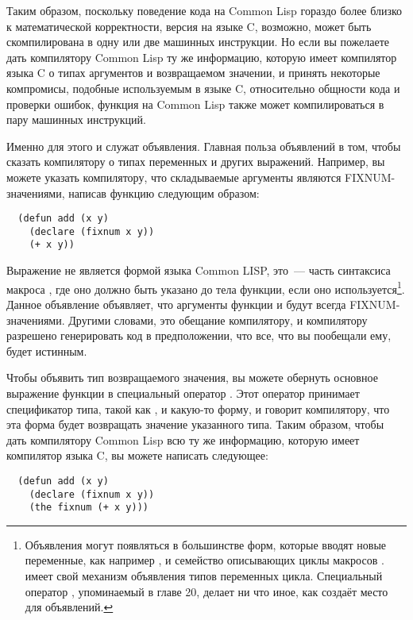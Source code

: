 Таким образом, поскольку поведение кода на Common Lisp гораздо более близко к
математической корректности, версия на языке C, возможно, может быть скомпилирована в одну
или две машинных инструкции. Но если вы пожелаете дать компилятору Common Lisp ту же
информацию, которую имеет компилятор языка C о типах аргументов и возвращаемом значении, и
принять некоторые компромисы, подобные используемым в языке C, относительно общности кода
и проверки ошибок, функция на Common Lisp также может компилироваться в пару машинных
инструкций.

Именно для этого и служат объявления. Главная польза объявлений в том, чтобы сказать компилятору о типах переменных и других выражений. Например, вы можете указать компилятору, что складываемые аргументы являются FIXNUM-значениями, написав функцию следующим образом:

\begin{lstlisting}
  (defun add (x y)
    (declare (fixnum x y))
    (+ x y))
\end{lstlisting}

Выражение  не является формой языка Common LISP, это~--- часть синтаксиса
макроса , где оно должно быть указано до тела функции, если оно
используется\footnote{Объявления могут появляться в большинстве форм, которые вводят новые
  переменные, как например ,  и семейство описывающих циклы макросов
  .  имеет свой механизм объявления типов переменных
  цикла. Специальный оператор , упоминаемый в главе 20, делает ни что иное,
  как создаёт место для объявлений.}. Данное объявление объявляет, что аргументы функции
 и  будут всегда FIXNUM-значениями. Другими словами, это обещание
компилятору, и компилятору разрешено генерировать код в предположении, что все, что вы
пообещали ему, будет истинным.

Чтобы объявить тип возвращаемого значения, вы можете обернуть основное выражение функции
 в специальный оператор . Этот оператор принимает спецификатор
типа, такой как , и какую-то форму, и говорит компилятору, что эта форма
будет возвращать значение указанного типа. Таким образом, чтобы дать компилятору Common
Lisp всю ту же информацию, которую имеет компилятор языка C, вы можете написать следующее:

\begin{lstlisting}
  (defun add (x y)
    (declare (fixnum x y))
    (the fixnum (+ x y)))
\end{lstlisting}

